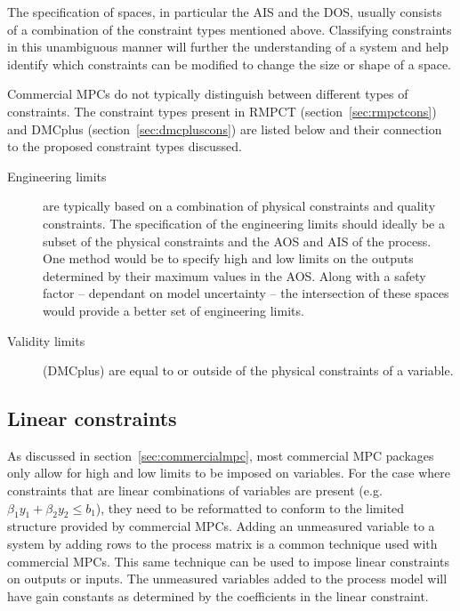 The specification of spaces, in particular the AIS and the DOS, usually consists of a combination of the constraint types mentioned above.
Classifying constraints in this unambiguous manner will further the understanding of a system and help identify which constraints can be modified to change the size or shape of a space.

Commercial MPCs do not typically distinguish between different types of constraints.
The constraint types present in RMPCT (section~\ref{sec:rmpctcons}) and DMCplus (section~\ref{sec:dmcpluscons}) are listed below and their connection to the proposed constraint types discussed.
\begin{description}
  \item [Engineering limits] are typically based on a combination of physical constraints and quality constraints.
  The specification of the engineering limits should ideally be a subset of the physical constraints and the AOS and AIS of the process.
  One method would be to specify high and low limits on the outputs determined by their maximum values in the AOS.
  Along with a safety factor -- dependant on model uncertainty -- the intersection of these spaces would provide a better set of engineering limits.
  \item [Validity limits] (DMCplus) are equal to or outside of the physical constraints of a variable.
\end{description}

\subsection{Linear constraints}\label{sec:lincons}
As discussed in section~\ref{sec:commercialmpc}, most commercial MPC packages only allow for high and low limits to be imposed on variables.
For the case where constraints that are linear combinations of variables are present (e.g. $\beta_1 y_1+\beta_2 y_2\leq b_1$), they need to be reformatted to conform to the limited structure provided by commercial MPCs.
Adding an unmeasured variable to a system by adding rows to the process matrix is a common technique used with commercial MPCs.
This same technique can be used to impose linear constraints  on outputs or inputs.
The unmeasured variables added to the process model will have gain constants as determined by the coefficients in the linear constraint.

